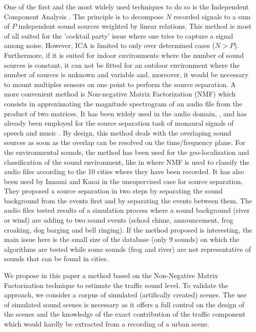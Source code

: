 \documentclass[twocolumn,a4paper,10pt]{article}
\begin{document}
One of the first and the most widely used techniques to do so is the Independent Component Analysis \cite{comon_independent_1994}. The principle is to decompose $N$ recorded signals to a sum of $P$ independent sound sources weighted by linear relations. This method is most of all suited for the 'cocktail party' issue where one tries to capture a signal among noise.  However, ICA is limited to only over determined cases ($N > P$). Furthermore, if it is suited for indoor environments where the number of sound sources is constant, it can not be fitted for an outdoor environment where the number of sources is unknown and variable and, moreover, it would be necessary to mount multiples sensors on one point to perform the source separation. A more convenient method is Non-negative Matrix Factorization (NMF) \cite{lee_learning_1999} which consists in approximating the magnitude spectrogram of an audio file from the product of two matrices. It has been widely used in the audio domain, \cite{smaragdis_non-negative_2003} \cite{wilson_speech_2008} \cite{mesaros_sound_2015}, and has already been employed for the source separation task of monaural signals of speech and music \cite{wang_musical_2005} \cite{wilson_speech_2008}. By design, this method deals with the overlaping sound sources as soon as the overlap can be resolved on the time/frequency plane. For the environmental sounds, the method has been used for the geo-localisation and classification of the sound environment, like in \cite{kumar_audio_2016} where NMF is used to classify the audio files according to the 10 cities where they have been recorded. It has also been used by Innami and Kasai in the unsupervised case \cite{satoshi_innami_nmf-based_2012} for source separation. They proposed a source separation in two steps by separating the sound background from the events first and by separating the events between them. The audio files tested results of a simulation process where a sound background (river or wind) are adding to two sound events (school chime, announcement, frog croaking, dog barging and bell ringing). If the method proposed is interesting, the main issue here is the small size of the database (only 9 sounds) on which the algorithms are tested while some sounds (frog and river) are not representative of sounds that can be found in cities.

We propose in this paper a method based on the Non-Negative Matrix Factorization technique to estimate the traffic sound level. To validate the approach, we consider a corpus of simulated (artifically created) scenes. The use of simulated sound scenes is necessary as it offers a full control on the design of the scenes and the knowledge of the exact contribution of the traffic component which would hardly be extracted from a recording of a urban scene.
\end{document}
